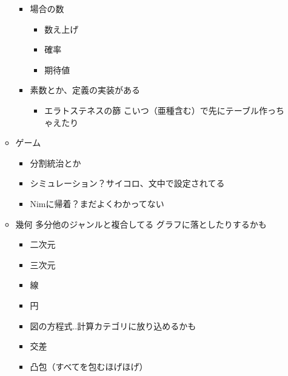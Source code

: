 \documentclass{jsarticle}
\begin{document}
\begin{itemize}
\begin{itemize}
\begin{itemize}
      \item 場合の数
      \begin{itemize}
        \item 数え上げ
        \item 確率
        \item 期待値
      \end{itemize}
      \item 素数とか、定義の実装がある
      \begin{itemize}
        \item エラトステネスの篩
          \newline こいつ（亜種含む）で先にテーブル作っちゃえたり
      \end{itemize}
    \end{itemize}
    \item ゲーム
    \begin{itemize}
      \item 分割統治とか
      \item シミュレーション？サイコロ、文中で設定されてる
      \item Nimに帰着？まだよくわかってない
    \end{itemize}
    \item 幾何
      \newline 多分他のジャンルと複合してる グラフに落としたりするかも
    \begin{itemize}
      \item 二次元
      \item 三次元
    \end{itemize}
    \begin{itemize}
      \item 線
      \item 円
      \item 図の方程式..計算カテゴリに放り込めるかも
      \item 交差
      \item 凸包（すべてを包むほげほげ）
    \end{itemize}
  \end{itemize}
\end{itemize}
\end{document}
